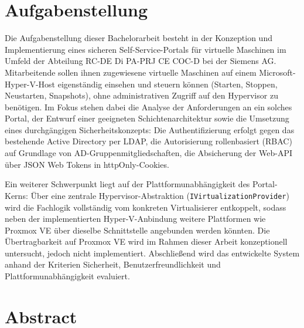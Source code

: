 \documentclass[12pt,a4paper]{article}
\begin{document}
\newpage

\section*{Aufgabenstellung}

Die Aufgabenstellung dieser Bachelorarbeit besteht in der Konzeption und Implementierung eines sicheren Self-Service-Portals für virtuelle Maschinen im Umfeld der Abteilung RC-DE Di PA-PRJ CE COC-D bei der Siemens AG. Mitarbeitende sollen ihnen zugewiesene virtuelle Maschinen auf einem Microsoft-Hyper-V-Host eigenständig einsehen und steuern können (Starten, Stoppen, Neustarten, Snapshots), ohne administrativen Zugriff auf den Hypervisor zu benötigen. Im Fokus stehen dabei die Analyse der Anforderungen an ein solches Portal, der Entwurf einer geeigneten Schichtenarchitektur sowie die Umsetzung eines durchgängigen Sicherheitskonzepts: Die Authentifizierung erfolgt gegen das bestehende Active Directory per LDAP, die Autorisierung rollenbasiert (RBAC) auf Grundlage von AD-Gruppenmitgliedschaften, die Absicherung der Web-API über JSON Web Tokens in httpOnly-Cookies.

Ein weiterer Schwerpunkt liegt auf der Plattformunabhängigkeit des Portal-Kerns: Über eine zentrale Hypervisor-Abstraktion (\texttt{IVirtualizationProvider}) wird die Fachlogik vollständig vom konkreten Virtualisierer entkoppelt, sodass neben der implementierten Hyper-V-Anbindung weitere Plattformen wie Proxmox VE über dieselbe Schnittstelle angebunden werden könnten. Die Übertragbarkeit auf Proxmox VE wird im Rahmen dieser Arbeit konzeptionell untersucht, jedoch nicht implementiert. Abschließend wird das entwickelte System anhand der Kriterien Sicherheit, Benutzerfreundlichkeit und Plattformunabhängigkeit evaluiert.

\newpage

\section*{Abstract}
\end{document}

